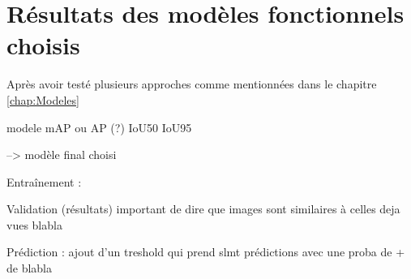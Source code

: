
\section{Résultats des modèles fonctionnels choisis}

Après avoir testé plusieurs approches comme mentionnées dans le chapitre \autoref{chap:Modeles}

modele
mAP ou AP (?)
IoU50
IoU95

--> modèle final choisi 

Entraînement : 

Validation (résultats) important de dire que images sont similaires à celles deja vues blabla

Prédiction : ajout d'un treshold qui prend slmt prédictions avec une proba de + de blabla
